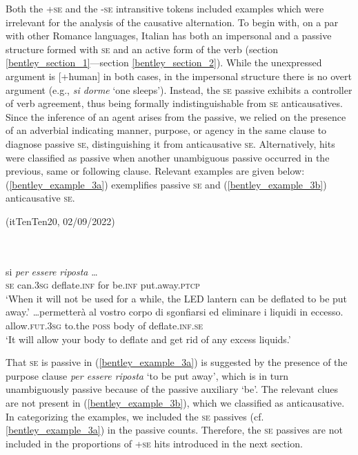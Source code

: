 \documentclass[output=paper,colorlinks,citecolor=brown
]{langscibook}
\begin{document}
Both the +\textsc{se} and the -\textsc{se} intransitive tokens included examples which were irrelevant for the analysis of the causative alternation. To begin with, on a par with other Romance languages, Italian has both an impersonal and a passive structure formed with \textsc{se} and an active form of the verb (section \ref{bentley_section_1}—section \ref{bentley_section_2}). While the unexpressed argument is [+human] in both cases, in the impersonal structure there is no overt argument (e.g., \textit{si dorme} ‘one sleeps’). Instead, the \textsc{se} passive exhibits a controller of verb agreement, thus being formally indistinguishable from \textsc{se} anticausatives. Since the inference of an agent arises from the passive, we relied on the presence of an adverbial indicating manner, purpose, or agency in the same clause to diagnose passive \textsc{se}, distinguishing it from anticausative \textsc{se}. Alternatively, hits were classified as passive when another unambiguous passive occurred in the previous, same or following clause. Relevant examples are given below: (\ref{bentley_example_3a}) exemplifies passive \textsc{se} and (\ref{bentley_example_3b}) anticausative \textsc{se}.

\hspace*{\fill}(itTenTen20, 02/09/2022)\quad

\ea \label{bentley_example_3}
    \ea \label{bentley_example_3a}
     \\
    {} \\
    \gll si   \textit{per} \textit{essere} \textit{riposta} \ldots  \\
    \textsc{se} can.3\textsc{sg} deflate.\textsc{inf} for be.\textsc{inf} put.away.\textsc{ptcp} \\
    \glt ‘When it will not be used for a while, the LED lantern can be deflated to be put away.’
    \ex \label{bentley_example_3b}
    \gll  \ldots  permetterà al vostro corpo di sgonfiarsi {ed eliminare i liquidi in eccesso.} \\
    allow.\textsc{fut}.3\textsc{sg} to.the \textsc{poss} body of deflate.\textsc{inf}.\textsc{se} {} \\
    \glt ‘It will allow your body to deflate and get rid of any excess liquids.’
    \z
\z

That \textsc{se} is passive in (\ref{bentley_example_3a}) is suggested by the presence of the purpose clause \textit{per essere riposta} ‘to be put away’, which is in turn unambiguously passive because of the passive auxiliary ‘be’. The relevant clues are not present in (\ref{bentley_example_3b}), which we classified as anticausative. In categorizing the examples, we included the \textsc{se} passives (cf. \ref{bentley_example_3a}) in the passive counts. Therefore, the \textsc{se} passives are not included in the proportions of +\textsc{se} hits introduced in the next section. 
\end{document}
